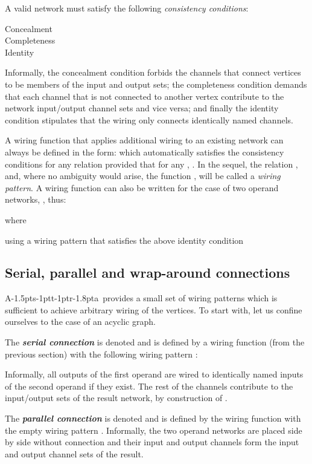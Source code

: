 \documentclass[11pt]{report}
\def\ak{{\textsf{A\kern-1.5pts\kern-1ptt\kern-1ptr\kern-1.8pta}}\kern-2pt{\it K\kern-2ptahn}}
\begin{document}
A valid network  must satisfy the following {\em consistency conditions}:
\begin{description}
\item[Concealment]  
\item[Completeness] 



\item[Identity]

\end{description}

Informally, the concealment condition forbids the channels that connect vertices to be members
of the input and output sets; the completeness condition demands that each channel that is not connected to another
vertex contribute to the network input/output channel sets and vice versa; and finally the identity condition
stipulates that the wiring only connects identically named channels.

A wiring function  that applies additional wiring to an existing network can
always be defined in the form: 
which automatically satisfies the consistency conditions for any relation 
provided that for any , .
In the sequel, the relation , and, where no ambiguity would arise, the function , will be called a {\em wiring
pattern}.  A wiring function can also be written for the case of two operand networks,
, thus:

where

using a wiring pattern  that satisfies the above identity condition


\subsection{Serial, parallel and wrap-around connections\label{sec:series}}

\ak\ provides a small set of wiring patterns which is sufficient to achieve arbitrary wiring of the vertices. To start with,
let us confine ourselves to the case of an acyclic graph.

The \textbf{\emph{ serial connection}} is denoted  and is defined by a wiring function  (from the previous section)
with the following wiring pattern :

Informally, all outputs of the first operand are wired to identically named inputs of the second operand if they exist. The rest of the channels
contribute to the input/output sets of the result network, by construction of .

The \textbf{\emph{ parallel connection}} is denoted  and is defined by the wiring function  with the empty wiring pattern . Informally, the two operand networks are placed side by side without connection and their input and output channels form
the input and output channel sets of the result.
\end{document}

